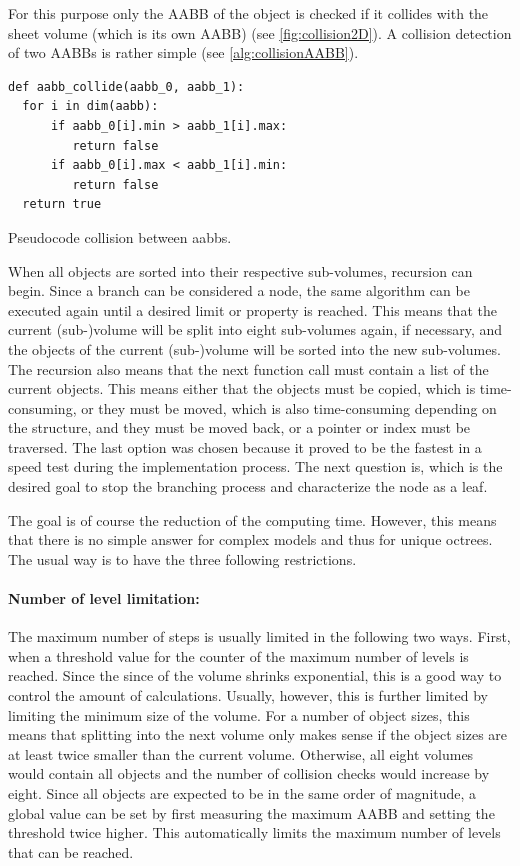 For this purpose only the \ac{AABB} of the object is checked if it collides with the sheet volume (which is its own \ac{AABB}) (see \cref{fig:collision2D}).
A collision detection of two \ac{AABB}s is rather simple (see \cref{alg:collisionAABB}).
% 
\begin{lstfloat}[!tb]
\lstset{style=python}
\begin{lstlisting}[]
def aabb_collide(aabb_0, aabb_1):
  for i in dim(aabb):
      if aabb_0[i].min > aabb_1[i].max:
         return false
      if aabb_0[i].max < aabb_1[i].min:
         return false
  return true
\end{lstlisting}
\caption{Pseudocode collision between aabbs.}
\label{alg:collisionAABB}
\end{lstfloat}
% 
When all objects are sorted into their respective sub-volumes, recursion can begin.
Since a branch can be considered a node, the same algorithm can be executed again until a desired limit or property is reached.
This means that the current (sub-)volume will be split into eight sub-volumes again, if necessary, and the objects of the current (sub-)volume will be sorted into the new sub-volumes.
The recursion also means that the next function call must contain a list of the current objects.
This means either that the objects must be copied, which is time-consuming, or they must be moved, which is also time-consuming depending on the structure, and they must be moved back, or a pointer or index must be traversed.
The last option was chosen because it proved to be the fastest in a speed test during the implementation process.
The next question is, which is the desired goal to stop the branching process and characterize the node as a leaf.
\par
% 
The goal is of course the reduction of the computing time.
However, this means that there is no simple answer for complex models and thus for unique octrees.
The usual way is to have the three following restrictions.
% 
\paragraph{Number of level limitation:}
The maximum number of steps is usually limited in the following two ways.
First, when a threshold value for the counter of the maximum number of levels is reached.
Since the since of the volume shrinks exponential, this is a good way to control the amount of calculations.
Usually, however, this is further limited by limiting the minimum size of the volume.
For a number of object sizes, this means that splitting into the next volume only makes sense if the object sizes are at least twice smaller than the current volume.
Otherwise, all eight volumes would contain all objects and the number of collision checks would increase by eight.
Since all objects are expected to be in the same order of magnitude, a global value can be set by first measuring the maximum \ac{AABB} and setting the threshold twice higher.
This automatically limits the maximum number of levels that can be reached.
% 
